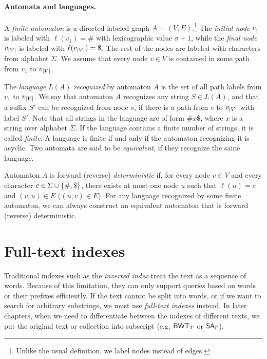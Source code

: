 \paragraph{Automata and languages.}

A \emph{finite automaton} is a directed labeled graph $A = (V, E)$.\footnote{Unlike the usual definition, we label nodes instead of edges.} The \emph{initial node} $v_{1}$ is labeled with $\ell(v_{1}) = \#$ with lexicographic value $\sigma + 1$, while the \emph{final node} $v_{\lvert V \rvert}$ is labeled with $\ell(v_{\abs{V}}) = \$$. The rest of the nodes are labeled with characters from alphabet $\Sigma$. We assume that every node $v \in V$ is contained in some path from $v_{1}$ to $v_{\lvert V \rvert}$.

\newpage The \emph{language} $L(A)$ \emph{recognized} by automaton $A$ is the set of all path labels
from $v_{1}$ to $v_{\lvert V \rvert}$. We say that automaton $A$ recognizes any string $S \in L(A)$, and that a suffix $S'$ can be recognized from node $v$, if there is a path from $v$ to $v_{\lvert V \rvert}$ with label $S'$. Note that all strings in the language are 
of form $\# x \$$, where $x$ is a string over alphabet $\Sigma$. If the language 
contains a finite number of strings, it is called \emph{finite}. A language is 
finite if and only if the automaton recognizing it is acyclic. Two automata are said to be \emph{equivalent}, if they recognize the same language.

Automaton $A$ is forward (reverse) \emph{deterministic} if, for every node $v \in V$ and every character $c \in \Sigma \cup \{ \#, \$ \}$, there exists at most one node $u$ such that $\ell(u) = c$ and $(v, u) \in E$ ($(u, v) \in E$). For any language recognized by some finite automaton, we can always construct an equivalent automaton that is forward (reverse) deterministic.


\section{Full-text indexes}\label{sect:full-text indexes}

Traditional indexes such as the \emph{inverted index} treat the text as a sequence of words. Because of this limitation, they can only support queries based on words or their prefixes efficiently. If the text cannot be split into words, or if we want to search for arbitrary substrings, we must use \emph{full-text indexes} instead. In later chapters, when we need to differentiate between the indexes of different texts, we put the original text or collection into subscript (e.g. $\mathsf{BWT}_{T}$ or $\mathsf{SA}_{\mathcal{C}}$).

